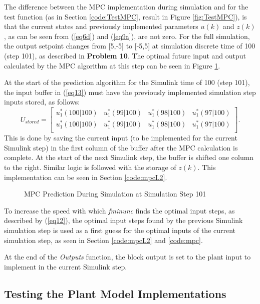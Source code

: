 \documentclass[12pt]{article}
\begin{document}
The difference between the MPC implementation during simulation and for the test function (as in Section \ref{code:TestMPC}, result in Figure \ref{fig:TestMPC}), is that the current states and previously implemented parameters $u(k)$ and $z(k)$, as can be seen from (\ref{eq6d}) and (\ref{eq9a}), are not zero. For the full simulation, the output setpoint changes from [5,-5] to [-5,5] at simulation discrete time of 100 (step 101), as described in \textbf{Problem 10}. The optimal future input and output calculated by the MPC algorithm at this step can be seen in Figure \ref{fig:MPCduringSim}. 

At the start of the prediction algorithm for the Simulink time of 100 (step 101), the input buffer in (\ref{eq13}) must have the previously implemented simulation step inputs stored, as follows:
\begin{equation}
U_{stored} = \begin{bmatrix}
u^*_1(100|100) & u^*_1(99|100) & u^*_1(98|100) & u^*_1(97|100) \\
u^*_1(100|100) & u^*_1(99|100) & u^*_1(98|100) & u^*_1(97|100) \\
\end{bmatrix}. \label{eq15}
\end{equation}
This is done by saving the current input (to be implemented for the current Simulink step) in the first column of the buffer after the MPC calculation is complete. At the start of the next Simulink step, the buffer is shifted one column to the right. Similar logic is followed with the storage of $z(k)$. This implementation can be seen in Section \ref{code:mpcL2}.

\begin{figure}[h!]
	
	\centering
	\caption{MPC Prediction During Simulation at Simulation Step 101}
	\label{fig:MPCduringSim}
\end{figure}

To increase the speed with which \textit{fminunc} finds the optimal input steps, as described by (\ref{eq12}), the optimal input steps found by the previous Simulink simulation step is used as a first guess for the optimal inputs of the current simulation step, as seen in Section \ref{code:mpcL2} and \ref{code:mpc}.

At the end of the \textit{Outputs} function, the block output is set to the plant input to implement in the current Simulink step.

\subsection{Testing the Plant Model Implementations}
\end{document}
